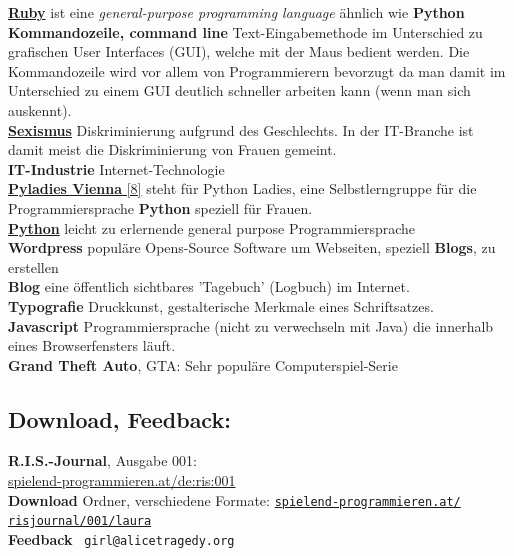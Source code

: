 \href{https://en.wikipedia.org/wiki/Ruby_(programming_language)}{\textbf{Ruby}} ist eine \textit{general-purpose programming language} ähnlich wie \textbf{Python} \\

\textbf{Kommandozeile, command line} Text-Eingabemethode im Unterschied zu grafischen User Interfaces (GUI), welche mit der Maus bedient werden. Die Kommandozeile wird vor allem von Programmierern bevorzugt da man damit im Unterschied zu einem GUI deutlich schneller arbeiten kann (wenn man sich auskennt). \\

\href{https://de.wikipedia.org/wiki/Sexismus}{\textbf{Sexismus}} Diskriminierung aufgrund des Geschlechts. In der IT-Branche ist damit meist die Diskriminierung von Frauen gemeint. \\

\textbf{IT-Industrie} Internet-Technologie \\

\href{https://twitter.com/pyladies_vie}{\textbf{Pyladies Vienna} [8]} steht für Python Ladies, eine Selbstlerngruppe für die Programmiersprache  \textbf{Python} speziell für Frauen. \\

\href{http://python.org}{\textbf{Python}} leicht zu erlernende general purpose Programmiersprache \\

\textbf{Wordpress} populäre Opens-Source Software um Webseiten, speziell \textbf{Blogs}, zu erstellen \\

\textbf{Blog} eine öffentlich sichtbares 'Tagebuch' (Logbuch) im Internet. \\

\textbf{Typografie} Druckkunst, gestalterische Merkmale eines Schriftsatzes. \\

\textbf{Javascript} Programmiersprache (nicht zu verwechseln mit Java) die innerhalb eines Browserfensters läuft. \\

\textbf{Grand Theft Auto}, GTA: Sehr populäre Computerspiel-Serie 

\subsection*{Download, Feedback:}
\textbf{R.I.S.-Journal}, Ausgabe 001: \\
\href{http://spielend-programmieren.at/de:ris:001}{spielend-programmieren.at/de:ris:001}\\
\textbf{Download} Ordner, verschiedene Formate: \href{http://spielend-programmieren.at/risjournal/001/laura}{\texttt{spielend-programmieren.at/\\risjournal/001/laura}} \\
\textbf{Feedback} \Letter\ \texttt{girl@alicetragedy.org} \\


